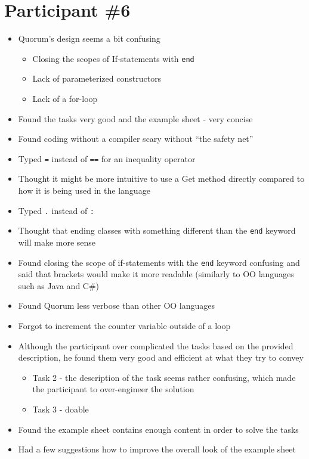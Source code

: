 \section{Participant {\#}6}
\begin{itemize}
\item Quorum’s design  seems a bit confusing
	\begin{itemize}
		\item Closing the scopes of If-statements with \lstinline!end!
		\item Lack of parameterized constructors
		\item Lack of a for-loop
	\end{itemize}
\item Found the tasks very good and the example sheet - very concise
\item Found coding without a compiler scary without “the safety net”
\item Typed \lstinline!=! instead of \lstinline!==! for an inequality operator
\item Thought it might be more intuitive to use a Get method directly compared to how it is being used in the language
\item Typed \lstinline!.! instead of \lstinline!:!
\item Thought that ending classes with something different than the \lstinline!end! keyword will make more sense
\item Found closing the scope of if-statements with the \lstinline!end! keyword confusing and said that brackets would make it more readable (similarly to OO languages such as Java and C\#)
\item Found Quorum less verbose than other OO languages
\item Forgot to increment the counter variable outside of a loop
\item Although the participant over complicated the tasks based on the provided description, he found them very good and efficient at what they try to convey
	\begin{itemize}
		\item Task 2 - the description of the task seems rather confusing, which made the participant to over-engineer the solution
		\item Task 3 - doable 
	\end{itemize}
\item Found the example sheet contains enough content in order to solve the tasks  
\item Had a few suggestions how to improve the overall look of the example sheet
\end{itemize}
